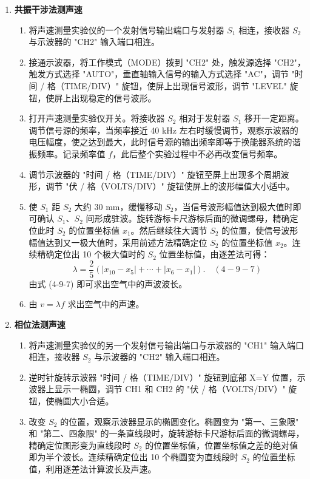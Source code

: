 \documentclass[12pt,a4paper]{article}
\begin{document}
\begin{enumerate}
\item \textbf{共振干涉法测声速}

\begin{enumerate}
\item 将声速测量实验仪的一个发射信号输出端口与发射器 $S_1$ 相连，接收器 $S_2$ 与示波器的 "CH2" 输入端口相连。
\item 接通示波器，将工作模式（MODE）拨到 "CH2" 处，触发源选择 "CH2"，触发方式选择 "AUTO"，垂直轴输入信号的输入方式选择 "AC"，调节 "时间 / 格（TIME/DIV）" 旋钮，使屏上出现信号波形，调节 "LEVEL" 旋钮，使屏上出现稳定的信号波形。
\item 打开声速测量实验仪开关。将接收器 $S_2$ 相对于发射器 $S_1$ 移开一定距离。调节信号源的频率，当频率接近 40 kHz 左右时缓慢调节，观察示波器的电压幅度，使之达到最大，此时信号源的输出频率即等于换能器系统的谐振频率。记录频率值 $f$，此后整个实验过程中不必再改变信号频率。
\item 调节示波器的 "时间 / 格（TIME/DIV）" 旋钮至屏上出现多个周期波形，调节 "伏 / 格（VOLTS/DIV）" 旋钮使屏上的波形幅值大小适中。
\item 使 $S_1$ 距 $S_2$ 大约 30 mm，缓慢移动 $S_2$，当信号波形幅值达到极大值时即可确认 $S_1$、$S_2$ 间形成驻波。旋转游标卡尺游标后面的微调螺母，精确定位此时 $S_2$ 的位置坐标值 $x_1$。然后继续往大调节 $S_2$ 的位置，使信号波形幅值达到又一极大值时，采用前述方法精确定位 $S_2$ 的位置坐标值 $x_2$。连续精确定位出 10 个极大值时的 $S_2$ 位置坐标值，由逐差法可得：
\begin{equation}
\lambda=\frac{2}{5}(|x_{10}-x_5|+\cdots+|x_6-x_1|). \quad (4-9-7)
\end{equation}
由式 (4-9-7) 即可求出空气中的声波波长。
\item 由 $v=\lambda f$ 求出空气中的声速。
\end{enumerate}

\item \textbf{相位法测声速}

\begin{enumerate}
\item 将声速测量实验仪的另一个发射信号输出端口与示波器的 "CH1" 输入端口相连，接收器 $S_2$ 与示波器的 "CH2" 输入端口相连。
\item 逆时针旋转示波器 "时间 / 格（TIME/DIV）" 旋钮到底部 X=Y 位置，示波器上显示一椭圆，调节 CH1 和 CH2 的 "伏 / 格（VOLTS/DIV）" 旋钮，使椭圆大小合适。
\item 改变 $S_2$ 的位置，观察示波器显示的椭圆变化。椭圆变为 "第一、三象限" 和 "第二、四象限" 的一条直线段时，旋转游标卡尺游标后面的微调螺母，精确定位图形变为直线段时 $S_2$ 的位置坐标值，位置坐标值之差的绝对值即为半个波长。连续精确定位出 10 个椭圆变为直线段时 $S_2$ 的位置坐标值，利用逐差法计算波长及声速。
\end{enumerate}
\end{enumerate}
\end{document}
